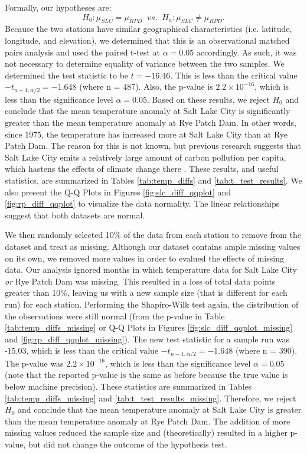 Formally, our hypotheses are: $$ H_{0}: \mu_{SLC} = \mu_{RPD} \;\; vs. \;\; H_{a}: \mu_{SLC} \neq \mu_{RPD}.$$ Because the two stations have similar geographical characteristics (i.e. latitude, longitude, and elevation), we determined that this is an observational matched pairs analysis and used the paired t-test at $\alpha = 0.05$ accordingly. As such, it was not necessary to determine equality of variance between the two samples. We determined the test statistic to be $t = -16.46$. This is less than the critical value $-t_{n-1,\alpha/2} = -1.648$ (where n = 487). Also, the p-value is $2.2 \times 10^{-16}$, which is less than the significance level $\alpha = 0.05$. Based on these results, we reject $H_{0}$ and conclude that the mean temperature anomaly at Salt Lake City is significantly greater than the mean temperature anomaly at Rye Patch Dam. In other words, since 1975, the temperature has increased more at Salt Lake City than at Rye Patch Dam. The reason for this is not known, but previous research suggests that Salt Lake City emits a relatively large amount of carbon pollution per capita, which hastens the effects of climate change there \cite{obama_report}. These results, and useful statistics, are summarized in Tables \ref{tab:temp_diffs} and \ref{tab:t_test_results}. We also present the Q-Q Plots in Figures \ref{fig:slc_diff_qqplot} and \ref{fig:rp_diff_qqplot} to visualize the data normality. The linear relationships suggest that both datasets are normal.

We then randomly selected 10\% of the data from each station to remove from the dataset and treat as missing. Although our dataset contains ample missing values on its own, we removed more values in order to evalued the effects of missing data. Our analysis ignored months in which temperature data for Salt Lake City \textit{or} Rye Patch Dam was missing. This resulted in a loss of total data points greater than 10\%, leaving us with a new sample size (that is different for each run) for each station. Performing the Shapiro-Wilk test again, the distribution of the observations were still normal (from the p-value in Table \ref{tab:temp_diffs_missing} or Q-Q Plots in Figures \ref{fig:slc_diff_qqplot_missing} and \ref{fig:rp_diff_qqplot_missing}). The new test statistic for a sample run was -15.03, which is less than the critical value  $-t_{n-1,\alpha/2} = -1.648$ (where n = 390). The p-value was $2.2 \times 10^{-16}$, which is less than the significance level $\alpha = 0.05$ (note that the reported p-value is the same as before because the true value is below machine precision). These statistics are summarized in Tables \ref{tab:temp_diffs_missing} and \ref{tab:t_test_results_missing}. Therefore, we reject $H_{0}$ and conclude that the mean temperature anomaly at Salt Lake City is greater than the mean temperature anomaly at Rye Patch Dam. The addition of more missing values reduced the sample size and (theoretically) resulted in a higher p-value, but did not change the outcome of the hypothesis test.
